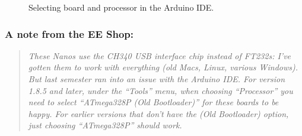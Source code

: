 \begin{figure}
    \centering
    \hfil

    \caption{Selecting board and processor in the Arduino IDE.
        \label{fig:selecting-nano}}
\end{figure}

\subsubsection*{A note from the EE Shop:}
\begin{quote}
\textit{These Nanos use the CH340 USB interface chip instead of FT232s: I've
gotten them to work with everything (old Macs, Linux, various Windows).  But
last semester ran into an issue with the Arduino IDE.   For version 1.8.5 and
later, under the ``Tools'' menu, when choosing ``Processor'' you need to select
``ATmega328P (Old Bootloader)'' for these boards to be happy.   For earlier
versions that don't have the (Old Bootloader) option, just choosing
``ATmega328P'' should work.}
\end{quote}

